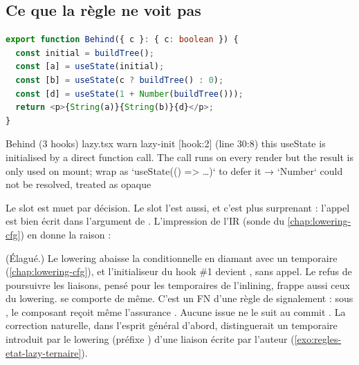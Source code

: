 \subsection{Ce que la règle ne voit pas}

\begin{lstlisting}[language=TypeScript,firstnumber=26,caption={Un appel caché, deux fois (\file{/tmp/ch18/lazy.tsx}, suite)},label={lst:regles-etat-lazy-behind}]
export function Behind({ c }: { c: boolean }) {
  const initial = buildTree();
  const [a] = useState(initial);
  const [b] = useState(c ? buildTree() : 0);
  const [d] = useState(1 + Number(buildTree()));
  return <p>{String(a)}{String(b)}{d}</p>;
}
\end{lstlisting}

\begin{sortie}
  Behind  (3 hooks)  lazy.tsx
    warn   lazy-init  [hook:2]  (line 30:8)  this useState is initialised by a direct function call. The call runs on every render but the result is only used on mount; wrap as `useState(() => …)` to defer it
       → `Number` could not be resolved, treated as opaque
\end{sortie}

Le slot  est muet par décision. Le slot  l'est aussi, et c'est plus surprenant : l'appel est bien écrit dans l'argument de . L'impression de l'IR (sonde du \cref{chap:lowering-cfg}) en donne la raison :


(Élagué.) Le lowering abaisse la conditionnelle en diamant avec un temporaire  (\cref{chap:lowering-cfg}), et l'initialiseur du hook \#1 devient , sans appel. Le refus de poursuivre les liaisons, pensé pour les temporaires de l'inlining, frappe aussi ceux du lowering.  se comporte de même. C'est un FN d'une règle de signalement : sous , le composant reçoit même l'assurance . Aucune issue ne le suit au commit \snapshotCommit. La correction naturelle, dans l'esprit \og général d'abord\fg, distinguerait un temporaire introduit par le lowering (préfixe ) d'une liaison écrite par l'auteur (\cref{exo:regles-etat-lazy-ternaire}).

